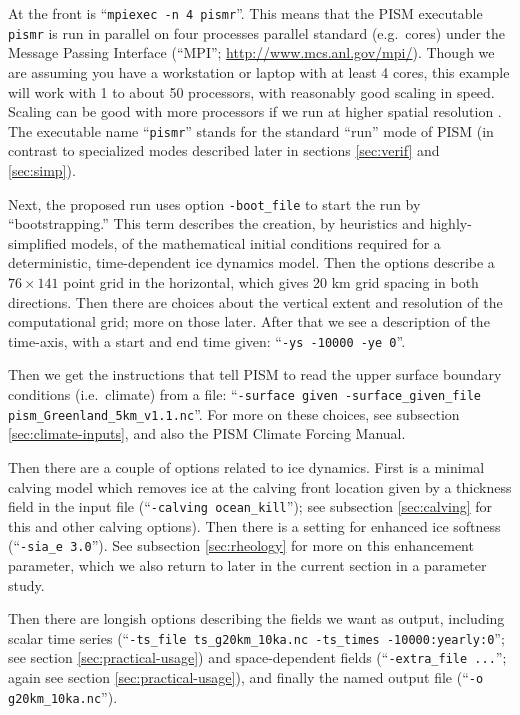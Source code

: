 At the front is ``\texttt{mpiexec -n 4 pismr}''.  This means that the PISM executable \texttt{pismr} is run in parallel on four processes parallel standard (e.g.~cores) under the Message Passing Interface (``MPI''; \url{http://www.mcs.anl.gov/mpi/}).  Though we are assuming you have a workstation or laptop with at least 4 cores, this example will work with 1 to about 50 processors, with reasonably good scaling in speed.  Scaling can be good with more processors if we run at higher spatial resolution \cite{BBssasliding,DickensMorey2013}.  The executable name ``\texttt{pismr}'' stands for the standard ``run'' mode of PISM (in contrast to specialized modes described later in sections \ref{sec:verif} and \ref{sec:simp}).

Next, the proposed run uses option \texttt{-boot_file} to start the run by ``bootstrapping.'' This term describes the creation, by heuristics and highly-simplified models, of the mathematical initial conditions required for a deterministic, time-dependent ice dynamics model.  Then the options describe a $76\times 141$ point grid in the horizontal, which gives 20 km grid spacing in both directions.  Then there are choices about the vertical extent and resolution of the computational grid; more on those later.  After that we see a description of the time-axis, with a start and end time given: ``\texttt{-ys -10000 -ye 0}''.

Then we get the instructions that tell PISM to read the upper surface boundary conditions (i.e.~climate) from a file: ``\texttt{-surface given -surface_given_file pism_Greenland_5km_v1.1.nc}''.  For more on these choices, see subsection \ref{sec:climate-inputs}, and also the PISM Climate Forcing Manual.

Then there are a couple of options related to ice dynamics.  First is a minimal calving model which removes ice at the calving front location given by a thickness field in the input file (``\texttt{-calving ocean_kill}''); see subsection \ref{sec:calving} for this and other calving options).  Then there is a setting for enhanced ice softness (``\texttt{-sia_e 3.0}'').  See subsection \ref{sec:rheology} for more on this enhancement parameter, which we also return to later in the current section in a parameter study.

Then there are longish options describing the fields we want as output, including scalar time series (``\texttt{-ts_file ts_g20km_10ka.nc -ts_times -10000:yearly:0}''; see section \ref{sec:practical-usage}) and space-dependent fields (``\texttt{-extra_file ...}''; again see section \ref{sec:practical-usage}), and finally the named output file (``\texttt{-o g20km_10ka.nc}'').

